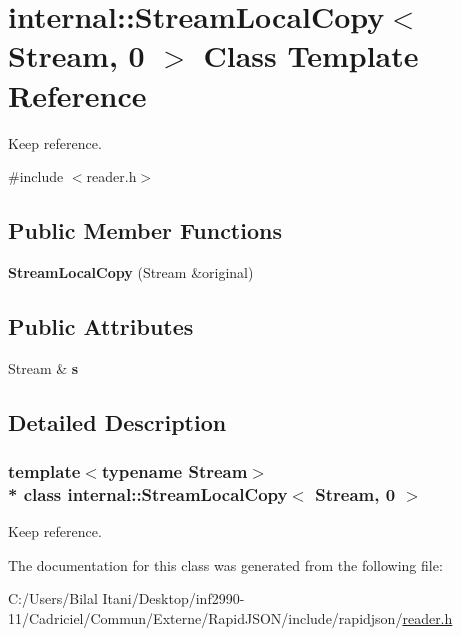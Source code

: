 \hypertarget{classinternal_1_1_stream_local_copy_3_01_stream_00_010_01_4}{}\section{internal\+:\+:Stream\+Local\+Copy$<$ Stream, 0 $>$ Class Template Reference}
\label{classinternal_1_1_stream_local_copy_3_01_stream_00_010_01_4}


Keep reference.  




{\ttfamily \#include $<$reader.\+h$>$}

\subsection*{Public Member Functions}
\begin{DoxyCompactItemize}
\item 
{\bfseries Stream\+Local\+Copy} (Stream \&original)\hypertarget{classinternal_1_1_stream_local_copy_3_01_stream_00_010_01_4_ac684a7be07d79d6ddd274dc1150f4b79}{}\label{classinternal_1_1_stream_local_copy_3_01_stream_00_010_01_4_ac684a7be07d79d6ddd274dc1150f4b79}

\end{DoxyCompactItemize}
\subsection*{Public Attributes}
\begin{DoxyCompactItemize}
\item 
Stream \& {\bfseries s}\hypertarget{classinternal_1_1_stream_local_copy_3_01_stream_00_010_01_4_ad31147888384f4bd51eabc2d7acdc4b6}{}\label{classinternal_1_1_stream_local_copy_3_01_stream_00_010_01_4_ad31147888384f4bd51eabc2d7acdc4b6}

\end{DoxyCompactItemize}


\subsection{Detailed Description}
\subsubsection*{template$<$typename Stream$>$\\*
class internal\+::\+Stream\+Local\+Copy$<$ Stream, 0 $>$}

Keep reference. 

The documentation for this class was generated from the following file\+:\begin{DoxyCompactItemize}
\item 
C\+:/\+Users/\+Bilal Itani/\+Desktop/inf2990-\/11/\+Cadriciel/\+Commun/\+Externe/\+Rapid\+J\+S\+O\+N/include/rapidjson/\hyperlink{reader_8h}{reader.\+h}\end{DoxyCompactItemize}
